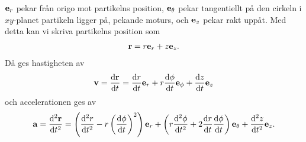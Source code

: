 $\vect{e}_{r}$ pekar från origo mot partikelns position, $\vect{e}_{\theta}$ pekar tangentiellt på den cirkeln i $xy$-planet partikeln ligger på, pekande moturs, och $\vect{e}_{z}$ pekar rakt uppåt. Med detta kan vi skriva partikelns position som
\begin{align*}
	\vect{r} = r\vect{e}_{r} + z\vect{e}_{z}.
\end{align*}
Då ges hastigheten av
\begin{align*}
	\vect{v} = \dv{\vect{r}}{t} = \dv{r}{t}\vect{e}_{r} + r\dv{\phi}{t}\vect{e}_{\phi} + \dv{z}{t}\vect{e}_{z}
\end{align*}
och accelerationen ges av
\begin{align*}
	\vect{a} = \dv[2]{\vect{r}}{t} = \left(\dv[2]{r}{t} - r\left(\dv{\phi}{t}\right)^2\right)\vect{e}_{r} + \left(r\dv[2]{\phi}{t} + 2\dv{r}{t}\dv{\phi}{t}\right)\vect{e}_{\theta} + \dv[2]{z}{t}\vect{e}_{z}.
\end{align*}